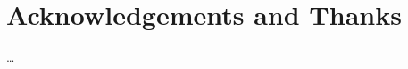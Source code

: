 \documentclass[12pt,twoside,openright]{book}
\begin{document}

\chapter*{Acknowledgements and Thanks}

\ldots


\tableofcontents

{}



\end{document}
